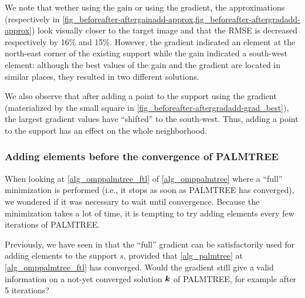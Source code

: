 \noindent
We note that wether using the gain or using the gradient, the approximations (respectively in \cref{fig_beforeafter-aftergainadd-approx,fig_beforeafter-aftergradadd-approx}) look visually closer to the target image and that the RMSE is decreased respectively by 16\% and 15\%. However, the gradient indicated an element at the north-east corner of the existing support while the gain indicated a south-west element: although the best values of the gain and the gradient are located in similar places, they resulted in two different solutions.

\noindent
We also observe that after adding a point to the support using the gradient (materialized by the  small square in \cref{fig_beforeafter-aftergradadd-grad_best}), the largest gradient values have “shifted” to the south-west. Thus, adding a point to the support has an effect on the whole neighborhood.

\FloatBarrier
\subsubsection{Adding elements before the convergence of \ac{PALMTREE}}\label{sec_add_before_converged}

When looking at \cref{alg_omppalmtree_ftl} of \cref{alg_omppalmtree} where a “full” minimization is performed (i.e., it stops as soon as \ac{PALMTREE} has converged), we wondered if it was necessary to wait until convergence. Because the minimization takes a lot of time, it is tempting to try adding elements every few iterations of \ac{PALMTREE}.

\noindent
Previously, we have seen in  that the “full” gradient can be satisfactorily used for adding elements to the support $s$, provided that \cref{alg_palmtree} at \cref{alg_omppalmtree_ftl} has converged. Would the gradient still give a valid information on a not-yet converged solution $\bm{k}$ of \ac{PALMTREE}, for example after 5 iterations?

